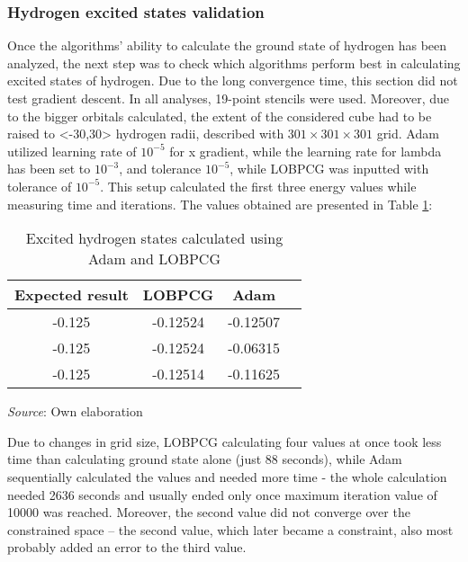 \subsubsection{Hydrogen excited states validation}

Once the algorithms' ability to calculate the ground state of hydrogen has been analyzed, the next step was to check which algorithms perform best in calculating excited states of hydrogen. Due to the long convergence time, this section did not test gradient descent. In all analyses, 19-point stencils were used. Moreover, due to the bigger orbitals calculated, the extent of the considered cube had to be raised to <-30,30> hydrogen radii, described with $301 \times 301 \times 301$ grid. Adam utilized learning rate of $10^{-5}$ for x gradient, while the learning rate for lambda has been set to $10^{-3}$, and tolerance $10^{-5}$, while LOBPCG was inputted with tolerance of $10^{-5}$. This setup calculated the first three energy values while measuring time and iterations. The values obtained are presented in Table \ref{tab:adam-excited}:

\begin{table}[!ht]
	\centering
	\caption{Excited hydrogen states calculated using Adam and LOBPCG}
	\label{tab:adam-excited}
	\small %
	\begin{tabular}{|c|c|c|c|}
		\hline
		\textbf{Expected result} & \textbf{LOBPCG} & \textbf{Adam} \\ \hline
		-0.125              & -0.12524    & -0.12507 \\ \hline
		-0.125              & -0.12524    & -0.06315 \\ \hline
		-0.125              & -0.12514    & -0.11625 \\ \hline
	\end{tabular}
	\smallskip
	
	\small \textit{Source}: Own elaboration
\end{table}

Due to changes in grid size, LOBPCG calculating four values at once took less time than calculating ground state alone (just 88 seconds), while Adam sequentially calculated the values and needed more time - the whole calculation needed 2636 seconds and usually ended only once maximum iteration value of 10000 was reached. Moreover, the second value did not converge over the constrained space -- the second value, which later became a constraint, also most probably added an error to the third value. 

